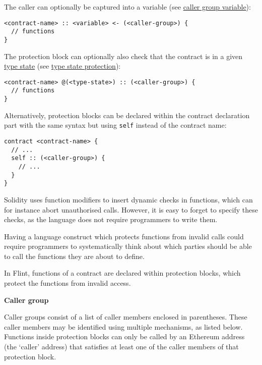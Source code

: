The caller can optionally be captured into a variable (see \hyperref[sec:appendix-b-caller-group-variable]{caller group variable}):

\begin{verbatim}
<contract-name> :: <variable> <- (<caller-group>) {
  // functions
}
\end{verbatim}

The protection block can optionally also check that the contract is in a given \hyperref[sec:appendix-b-type-states]{type state} (see \hyperref[sec:appendix-b-type-state-protection]{type state protection}):

\begin{verbatim}
<contract-name> @(<type-state>) :: (<caller-group>) {
  // functions
}
\end{verbatim}

Alternatively, protection blocks can be declared within the contract declaration part with the same syntax but using \texttt{self} instead of the contract name:

\begin{verbatim}
contract <contract-name> {
  // ...
  self :: (<caller-group>) {
    // ...
  }
}
\end{verbatim}

Solidity uses function modifiers to insert dynamic checks in functions, which can for instance abort unauthorised calls. However, it is easy to forget to specify these checks, as the language does not require programmers to write them.

Having a language construct which protects functions from invalid calls could require programmers to systematically think about which parties should be able to call the functions they are about to define.

In Flint, functions of a contract are declared within protection blocks, which protect the functions from invalid access.

\textbf{Caller group}
\label{sec:appendix-b-caller-group}

Caller groups consist of a list of caller members enclosed in parentheses. These caller members may be identified using multiple mechanisms, as listed below. Functions inside protection blocks can only be called by an Ethereum address (the `caller' address) that satisfies at least one of the caller members of that protection block.

